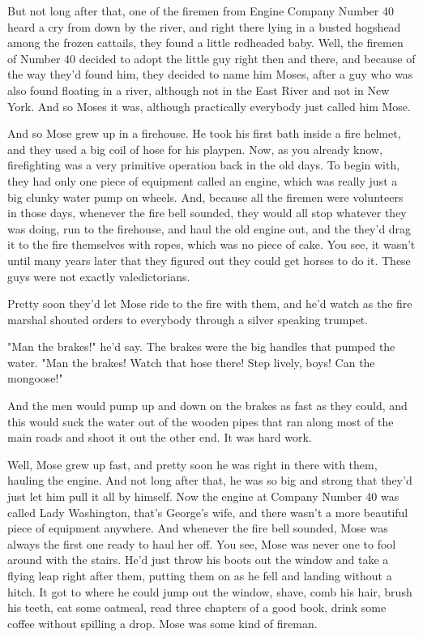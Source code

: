 But not long after that, one of the firemen from Engine Company Number 40 heard a cry from down by the river, and right there lying in a busted hogshead among the frozen cattails, they found a little redheaded baby. Well, the firemen of Number 40 decided to adopt the little guy right then and there, and because of the way they'd found him, they decided to name him Moses, after a guy who was also found floating in a river, although not in the East River and not in New York. And so Moses it was, although practically everybody just called him Mose.

And so Mose grew up in a firehouse. He took his first bath inside a fire helmet, and they used a big coil of hose for his playpen. Now, as you already know, firefighting was a very primitive operation back in the old days. To begin with, they had only one piece of equipment called an engine, which was really just a big clunky water pump on wheels. And, because all the firemen were volunteers in those days, whenever the fire bell sounded, they would all stop whatever they was doing, run to the firehouse, and haul the old engine out, and the they'd drag it to the fire themselves with ropes, which was no piece of cake. You see, it wasn't until many years later that they figured out they could get horses to do it. These guys were not exactly valedictorians.

Pretty soon they'd let Mose ride to the fire with them, and he'd watch as the fire marshal shouted orders to everybody through a silver speaking trumpet.

"Man the brakes!" he'd say. The brakes were the big handles that pumped the water. "Man the brakes! Watch that hose there! Step lively, boys! Can the mongoose!"

And the men would pump up and down on the brakes as fast as they could, and this would suck the water out of the wooden pipes that ran along most of the main roads and shoot it out the other end. It was hard work.

Well, Mose grew up fast, and pretty soon he was right in there with them, hauling the engine. And not long after that, he was so big and strong that they'd just let him pull it all by himself. Now the engine at Company Number 40 was called Lady Washington, that's George's wife, and there wasn't a more beautiful piece of equipment anywhere. And whenever the fire bell sounded, Mose was always the first one ready to haul her off. You see, Mose was never one to fool around with the stairs. He'd just throw his boots out the window and take a flying leap right after them, putting them on as he fell and landing without a hitch. It got to where he could jump out the window, shave, comb his hair, brush his teeth, eat some oatmeal, read three chapters of a good book, drink some coffee without spilling a drop. Mose was some kind of fireman.

